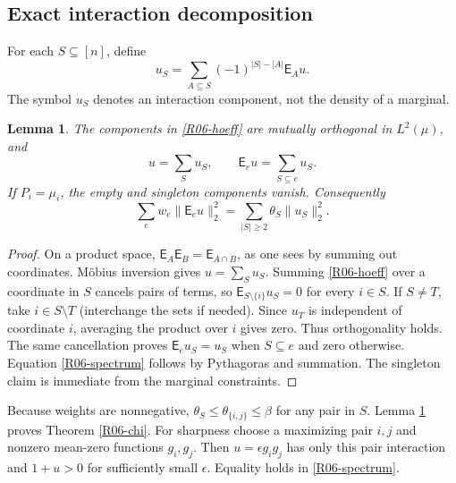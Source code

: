 \documentclass[11pt,a4paper]{article}
\newtheorem{lemma}[theorem]{Lemma}
\theoremstyle{definition}\newtheorem{definition}[theorem]{Definition}
\theoremstyle{remark}\newtheorem{remark}[theorem]{Remark}
\numberwithin{equation}{section}
\begin{document}
\subsection{Exact interaction decomposition}\label{R06-sec-2}
For each $S\subseteq[n]$, define
\begin{equation}\label{R06-hoeff}
u_S=\sum_{A\subseteq S}(-1)^{|S|-|A|}\mathsf E_Au.
\end{equation}
The symbol $u_S$ denotes an interaction component, not the density of a marginal.
\begin{lemma}\label{R06-anova}
The components in \eqref{R06-hoeff} are mutually orthogonal in $L^2(\mu)$, and
\[
u=\sum_Su_S,\qquad \mathsf E_eu=\sum_{S\subseteq e}u_S.
\]
If $P_i=\mu_i$, the empty and singleton components vanish. Consequently
\begin{equation}\label{R06-spectrum}
\sum_e w_e\|\mathsf E_eu\|_2^2
=\sum_{|S|\geq2}\theta_S\|u_S\|_2^2.
\end{equation}
\end{lemma}
\begin{proof}
On a product space, $\mathsf E_A\mathsf E_B=\mathsf E_{A\cap B}$, as one sees by summing out coordinates. M\"obius inversion gives $u=\sum_Su_S$. Summing \eqref{R06-hoeff} over a coordinate in $S$ cancels pairs of terms, so $\mathsf E_{S\setminus\{i\}}u_S=0$ for every $i\in S$. If $S\ne T$, take $i\in S\setminus T$ (interchange the sets if needed). Since $u_T$ is independent of coordinate $i$, averaging the product over $i$ gives zero. Thus orthogonality holds. The same cancellation proves $\mathsf E_eu_S=u_S$ when $S\subseteq e$ and zero otherwise. Equation \eqref{R06-spectrum} follows by Pythagoras and summation. The singleton claim is immediate from the marginal constraints.
\end{proof}
Because weights are nonnegative, $\theta_S\leq\theta_{\{i,j\}}\leq\beta$ for any pair in $S$. Lemma \ref{R06-anova} proves Theorem \ref{R06-chi}. For sharpness choose a maximizing pair $i,j$ and nonzero mean-zero functions $g_i,g_j$. Then $u=\epsilon g_ig_j$ has only this pair interaction and $1+u>0$ for sufficiently small $\epsilon$. Equality holds in \eqref{R06-spectrum}.
\end{document}
